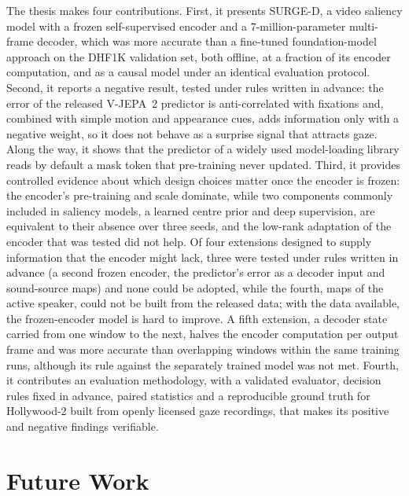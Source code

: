 The thesis makes four contributions. First, it presents SURGE-D, a video
saliency model with a frozen self-supervised encoder and a 7-million-parameter
multi-frame decoder, which was more accurate than a fine-tuned foundation-model
approach on the DHF1K validation set, both offline, at a fraction of its encoder
computation, and as a causal model under an identical evaluation protocol.
Second, it reports a negative result, tested under rules written in advance:
the error of the released \acrshort{V-JEPA}~2 predictor is anti-correlated with
fixations and, combined with simple motion and appearance cues, adds
information only with a negative weight, so it does not behave as a surprise
signal that attracts gaze. Along the way, it shows that the predictor of a
widely used model-loading library reads by default a mask token that
pre-training never updated. Third, it provides controlled evidence about
which design choices matter
once the encoder is frozen: the encoder's pre-training and scale dominate,
while two components commonly included in saliency models, a learned centre
prior and deep supervision, are equivalent to their absence over three seeds,
and the low-rank adaptation of the encoder that was tested did not help. Of
four extensions designed to supply information that the encoder might lack,
three were tested under rules written in advance (a second frozen encoder, the
predictor's error as a decoder input and sound-source maps) and none could be
adopted, while the fourth, maps of the active speaker, could not be built from
the released data; with the data available, the frozen-encoder model is hard
to improve. A fifth extension, a decoder state carried from one window to the
next, halves the encoder computation per output frame and was more accurate
than overlapping windows within the same training runs, although its rule
against the separately trained model was not met. Fourth, it
contributes an evaluation methodology, with a validated evaluator, decision
rules fixed in advance, paired statistics and a reproducible ground truth for
Hollywood-2 built from openly licensed gaze recordings, that makes its positive
and negative findings verifiable.

\section{Future Work}\label{sec:future}


